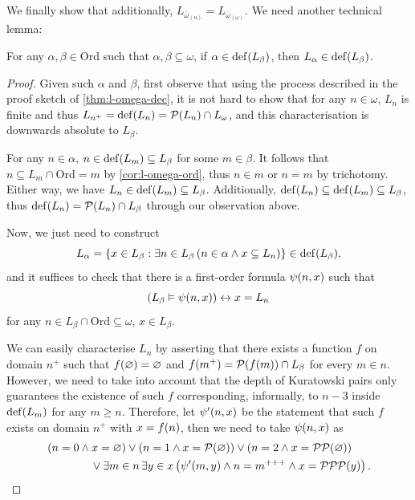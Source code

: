 \documentclass[12pt,openany]{book}
\theoremstyle{plain}
\theoremstyle{definition}
\newcommand\opE[1]{\mathop{\exists #1}}
\newcommand\Pow{\mathcal{P}}
\DeclareMathOperator\dd{def}
\newcommand\IKP{\mathrm{IKP}}
\newcommand\Ord{\mathrm{Ord}}
\begin{document}
We finally show that additionally, $L_{\overline{\omega}_{(u)}} = L_{\overline{\omega}_{(\omega)}}$. We need another technical lemma:
\begin{lemma}[$\IKP$]
  \label{lem:sub-omega-l-def}
  For any $\alpha, \beta \in \Ord$ such that $\alpha, \beta \subseteq \omega$, if $\alpha \in \dd\mleft(L_\beta\mright)$, then $L_\alpha \in \dd\mleft(L_\beta\mright)$.
\end{lemma}

\begin{proof}
  Given such $\alpha$ and $\beta$, first observe that using the process described in the proof sketch of \autoref{thm:l-omega-dec}, it is not hard to show that for any $n \in \omega$, $L_n$ is finite and thus $L_{n^+} = \dd\mleft(L_n\mright) = \Pow\mleft(L_n\mright) \cap L_\omega$, and this characterisation is downwards absolute to $L_\beta$.

  For any $n \in \alpha$, $n \in \dd\mleft(L_m\mright) \subseteq L_\beta$ for some $m \in \beta$. It follows that $n \subseteq L_m \cap \Ord = m$ by \autoref{cor:l-omega-ord}, thus $n \in m$ or $n = m$ by trichotomy. Either way, we have $L_n \in \dd\mleft(L_m\mright) \subseteq L_\beta$. Additionally, $\dd\mleft(L_n\mright) \subseteq \dd\mleft(L_m\mright) \subseteq L_\beta$, thus $\dd\mleft(L_n\mright) = \Pow\mleft(L_n\mright) \cap L_\beta$ through our observation above.

  Now, we just need to construct
  \[L_\alpha = \left\{x \in L_\beta : \opE{n \in L_\beta} \left(n \in \alpha \land x \subseteq L_n\right)\right\} \in \dd\mleft(L_\beta\mright),\]
  and it suffices to check that there is a first-order formula $\psi\mleft(n, x\mright)$ such that
  \[\left(L_\beta \vDash \psi\mleft(n, x\mright)\right) \leftrightarrow x = L_n\]
  for any $n \in L_\beta \cap \Ord \subseteq \omega$, $x \in L_\beta$.

  We can easily characterise $L_n$ by asserting that there exists a function $f$ on domain $n^+$ such that $f\mleft(\varnothing\mright) = \varnothing$ and $f\mleft(m^+\mright) = \Pow\mleft(f\mleft(m\mright)\mright) \cap L_\beta$ for every $m \in n$. However, we need to take into account that the depth of Kuratowski pairs only guarantees the existence of such $f$ corresponding, informally, to $n - 3$ inside $\dd\mleft(L_m\mright)$ for any $m \geq n$. Therefore, let $\psi'\mleft(n, x\mright)$ be the statement that such $f$ exists on domain $n^+$ with $x = f\mleft(n\mright)$, then we need to take $\psi\mleft(n, x\mright)$ as
  \begin{align*}
     & \left(n = 0 \land x = \varnothing\right) \lor \left(n = 1 \land x = \Pow\mleft(\varnothing\mright)\right) \lor \left(n = 2 \land x = \Pow\Pow\mleft(\varnothing\mright)\right) \\
     & \qquad \qquad {} \lor \opE{m \in n} \opE{y \in x} \left(\psi'\mleft(m, y\mright) \land n = m^{+++} \land x = \Pow\Pow\Pow\mleft(y\mright)\right). \qedhere
  \end{align*}
\end{proof}
\end{document}

